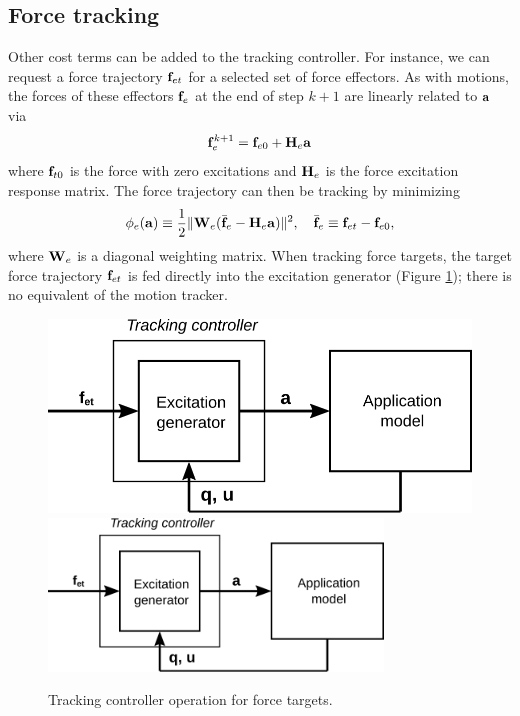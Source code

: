 \subsection{Force tracking}
\label{ForceTracking:sec}

Other cost terms can be added to the tracking controller.  For
instance, we can request a force trajectory ${\bf f}_{et}$ for a selected set
of force effectors. As with motions, the forces of these effectors
${\bf f}_e$ at the end of step $k+1$ are linearly related to ${\bf a}$ via
%
\begin{equation*}
{\bf f}_e^{k+1} = {\bf f}_{e0} + {\bf H}_e {\bf a}
\end{equation*}
%
where ${\bf f}_{t0}$ is the force with zero excitations and ${\bf H}_e$ is
the force excitation response matrix. The force trajectory can
then be tracking by minimizing
%
\begin{equation}
\phi_e({\bf a}) \equiv \frac{1}{2} \| {\bf W}_e (\bar{{\bf f}}_e - {\bf H}_e {\bf a}) \|^2, \quad
\bar{{\bf f}}_e \equiv {\bf f}_{et} - {\bf f}_{e0},
\label{forceEffectorCostTerm:eqn}	
\end{equation}
%
where ${\bf W}_e$ is a diagonal weighting matrix.
When tracking force targets, the target force trajectory ${\bf f}_{et}$ is fed
directly into the excitation generator (Figure \ref{trackingForces:fig}); there
is no equivalent of the motion tracker.

\begin{figure}[ht]
\begin{center}
\iflatexml
   \includegraphics[]{images/trackingForces}
\else
   \includegraphics[width=3.5in]{images/trackingForces}
\fi
\end{center}
\caption{Tracking controller operation for force targets.}
\label{trackingForces:fig}
\end{figure}

